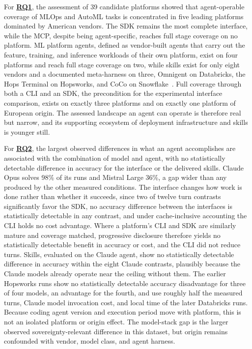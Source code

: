 \documentclass[
english,                 %
bibtex,                  %
]{kththesis}
\numberwithin{listing}{chapter}
\begin{document}
For \hyperref[rq1]{\textbf{RQ1}}, the assessment of 39 candidate platforms showed that agent-operable coverage of \gls{MLOps} and \gls{AutoML} tasks is concentrated in five leading platforms dominated by American vendors. The \gls{SDK} remains the most complete interface, while the \gls{MCP}, despite being agent-specific, reaches full stage coverage on no platform. \Gls{ML} platform agents, defined as vendor-built agents that carry out the feature, training, and inference workloads of their own platform, exist on four platforms and reach full stage coverage on two, while skills exist for only eight vendors and a documented meta-harness on three, Omnigent on Databricks, the Hops Terminal on Hopsworks, and CoCo on Snowflake~\cite{dwivedi_snowflake_2026}. Full coverage through both a \gls{CLI} and an \gls{SDK}, the precondition for the experimental interface comparison, exists on exactly three platforms and on exactly one platform of European origin. The assessed landscape an agent can operate is therefore real but narrow, and its supporting ecosystem of deployment infrastructure and skills is younger still.

For \hyperref[rq2]{\textbf{RQ2}}, the largest observed differences in what an agent accomplishes are associated with the combination of model and agent, with no statistically detectable difference in accuracy for the interface or the delivered skills. Claude Opus solves 98\% of its runs and Mistral Large 36\%, a gap wider than any produced by the other measured conditions. The interface changes how work is done rather than whether it succeeds, since two of twelve turn contrasts significantly favor the \gls{SDK}, no accuracy difference between the interfaces is statistically detectable in any contrast, and under cache-inclusive accounting the \gls{CLI} holds no cost advantage. Where a platform's \gls{CLI} and \gls{SDK} are similarly mature and coverage matched, progressive disclosure therefore yields no statistically detectable benefit in accuracy or cost, and the \gls{CLI} did not reduce turns. Skills, evaluated on the Claude agent, show no statistically detectable difference in accuracy within the eight Claude contrasts, plausibly because the Claude models already operate near the ceiling without them. The earlier Hopsworks runs show no statistically detectable accuracy disadvantage for three of four models, an advantage for the fourth, and use roughly half the measured turns, Claude model invocation cost, and local time of the later Databricks runs. Because coding agent version and execution period move with platform, this is not an isolated platform or origin effect. The model-stack gap is the larger observed sovereignty-relevant difference in this dataset, but origin remains confounded with vendor, model class, and agent harness.
\end{document}
